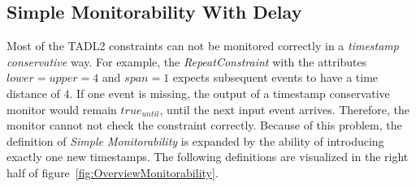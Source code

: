 	\subsection{Simple Monitorability With Delay}
		Most of the TADL2 constraints can not be monitored correctly in a \emph{timestamp conservative} way. For example, the \emph{RepeatConstraint} with the attributes $lower=upper=4$ and $span=1$ expects subsequent events to have a time distance of $4$. If one event is missing, the output of a timestamp conservative monitor would remain $true_{until}$, until the next input event arrives. Therefore, the monitor cannot not check the constraint correctly. Because of this problem, the definition of \emph{Simple Monitorability} is expanded by the ability of introducing exactly one new timestamps. The following definitions are visualized in the right half of figure~\ref{fig:OverviewMonitorability}.
